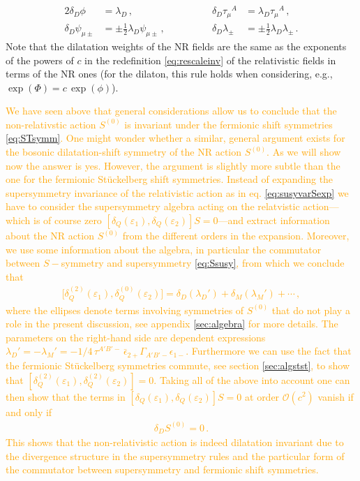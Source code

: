 \documentclass[a4paper,10pt,openany]{article}
\newcommand{\JL}[1]{\textcolor{orange}{#1}}
\begin{document}
	\begin{alignat}{2}
		\label{eq:dilsymm}
		\delta_D \phi &= \lambda_D \,, \qquad \qquad & \delta_D \tau_\mu{}^A &= \lambda_D \tau_\mu{}^A \,, \nonumber \\
		\delta_D \psi_{\mu\pm} &= \pm \frac12 \lambda_D \psi_{\mu\pm} \,, \qquad \qquad & \delta_D \lambda_{\pm} &= \pm \frac12 \lambda_D \lambda_{\pm} \,.
	\end{alignat}
	Note that the dilatation weights of the NR fields are the same as the exponents of the powers of $c$ in the redefinition \eqref{eq:rescaleinv} of the relativistic fields in terms of the NR ones (for the dilaton, this rule holds when considering, e.g., $\exp(\Phi) = c\, \exp(\phi)$).
	
	\JL{We have seen above that general considerations allow us to conclude that the non-relativstic action $S^{(0)}$ is invariant under the fermionic shift symmetries \eqref{eq:STsymm}. One might wonder whether a similar, general argument exists for the bosonic dilatation-shift symmetry of the NR action $S^{(0)}$. As we will show now the answer is yes. However, the argument is slightly more subtle than the one for the fermionic St\"uckelberg shift symmetries. Instead of expanding the supersymmetry invariance of the relativistic action as in eq. \eqref{eq:susyvarSexp} we have to consider the supersymmetry algebra acting on the relatvistic action---which is of course zero $[\delta_Q(\varepsilon_1),\delta_Q(\varepsilon_2)]S=0$---and extract information about the NR action $S^{(0)}$ from the different orders in the expansion. Moreover, we use some information about the algebra, in particular the commutator between $S-$symmetry and supersymmetry \eqref{eq:Ssusy}, from which we conclude that
		\begin{align}
			\big[\delta_Q^{(2)}(\varepsilon_1),\delta_Q^{(0)}(\varepsilon_2)\big] = \delta_D(\lambda_D')+\delta_M(\lambda_M')+\cdots\,,
		\end{align}
		where the ellipses denote terms involving symmetries of $S^{(0)}$ that do not play a role in the present discussion, see appendix \ref{sec:algebra} for more details. The parameters on the right-hand side are dependent expressions  $\lambda_D'=-\lambda_M' = -1/4\,\tau^{A'B'-}\,\bar\epsilon_{2+}\Gamma_{A'B'-}\epsilon_{1-}$. Furthermore we can use the fact that the fermionic St\"uckelberg symmetries commute, see section \ref{sec:algstst}, to show that $[\delta_Q^{(2)}(\varepsilon_1),\delta^{(2)}_Q(\varepsilon_2)]=0$. Taking all of the above into account one can then show that the terms in $[\delta_Q(\varepsilon_1),\delta_Q(\varepsilon_2)]S=0$ at order $\mathcal O(c^2)$ vanish if and only if
		\begin{align}
			\delta_D S^{(0)}=0\,.
		\end{align}
		This shows that the non-relativistic action is indeed dilatation invariant due to the divergence structure in the supersymmetry rules and the particular form of the commutator between supersymmetry and fermionic shift symmetries.}
	
\end{document}
